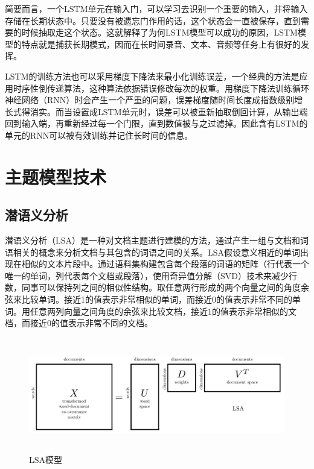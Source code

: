 \documentclass[winfonts,master,oneside,nobackinfo]{njuthesis}
\begin{document}
简要而言，一个LSTM单元在输入门，可以学习去识别一个重要的输入，并将输入存储在长期状态中。只要没有被遗忘门作用的话，这个状态会一直被保存，直到需要的时候抽取走这个状态。这就解释了为何LSTM模型可以成功的原因，LSTM模型的特点就是捕获长期模式，因而在长时间录音、文本、音频等任务上有很好的发挥。

LSTM的训练方法也可以采用梯度下降法来最小化训练误差，一个经典的方法是应用时序性倒传递算法，这种算法依据错误修改每次的权重。用梯度下降法训练循环神经网络（RNN）时会产生一个严重的问题，误差梯度随时间长度成指数级别增长式得消实。而当设置成LSTM单元时，误差可以被重新抽取倒回计算，从输出端回到输入端，再重新经过每一个门限，直到数值被与之过滤掉。因此含有LSTM的单元的RNN可以被有效训练并记住长时间的信息。

\section{主题模型技术}

\subsection{潜语义分析}

潜语义分析（LSA）是一种对文档主题进行建模的方法，通过产生一组与文档和词语相关的概念来分析文档与其包含的词语之间的关系。LSA假设意义相近的单词出现在相似的文本片段中。通过语料集构建包含每个段落的词语的矩阵（行代表一个唯一的单词，列代表每个文档或段落），使用奇异值分解（SVD）技术来减少行数，同事可以保持列之间的相似性结构。取任意两行形成的两个向量之间的角度余弦来比较单词。接近1的值表示非常相似的单词，而接近0的值表示非常不同的单词。用任意两列向量之间角度的余弦来比较文档，接近1的值表示非常相似的文档，而接近0的值表示非常不同的文档。

\begin{figure}[h]
\centering
\begin{minipage}[t]{\textwidth}
\includegraphics[width=1.0\textwidth,height=5.0cm]{./figure/LSA.jpg}
\caption{LSA模型}
\label{lab:1}
\end{minipage}
\end{figure}
\end{document}
